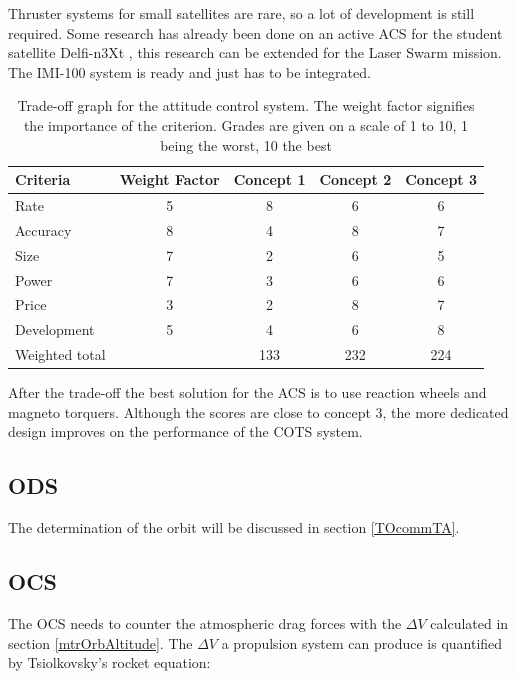 Thruster systems for small satellites are rare, so a lot of development is still required. Some research has already been done on an active \ac{ACS} for the student satellite Delfi-n3Xt \cite{delfispace}, this research can be extended for the Laser Swarm mission. The IMI-100 system is ready and just has to be integrated. 

\begin{table} [h]
\centering
\begin{tabular}{p{3cm} | c | c c c}
\textbf{Criteria} & \textbf{Weight Factor} & \textbf{Concept 1} & \textbf{Concept 2} & \textbf{Concept 3} \\ \hline \hline
Rate 	    & 5 & 8 & 6 & 6 \\
Accuracy    & 8 & 4 & 8 & 7 \\
Size        & 7 & 2 & 6 & 5 \\
Power       & 7 & 3 & 6 & 6 \\
Price       & 3 & 2 & 8 & 7 \\
Development & 5 & 4 & 6 & 8 \\ \hline
Weighted total    &    & 133 & 232 & 224
\end{tabular} 
\caption[Trade-off attitude control]{Trade-off graph for the attitude control system. The weight factor signifies the importance of the criterion. Grades are given on a scale of 1 to 10, 1 being the worst, 10 the best}
\label{tab:acstradeoff}
\end{table}

After the trade-off the best solution for the \ac{ACS} is to use reaction wheels and magneto torquers. Although the scores are close to concept 3, the more dedicated design improves on the performance of the \ac{COTS} system.

\subsection{\acl{ODS}}
\label{ss:ods}
The determination of the orbit will be discussed in section \ref{TOcommTA}.

\subsection{\acl{OCS}}
\label{ss:ocs}

The \ac{OCS} needs to counter the atmospheric drag forces with the $\Delta V$ calculated in section \ref{mtrOrbAltitude}. The $\Delta V$ a propulsion system can produce is quantified by Tsiolkovsky's rocket equation:

